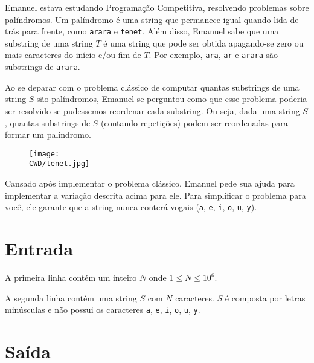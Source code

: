 %

Emanuel estava estudando Programação Competitiva, resolvendo problemas sobre palíndromos. Um palíndromo é uma string que permanece igual quando lida de trás para frente, como {\tt arara} e {\tt tenet}. Além disso, Emanuel sabe que uma substring de uma string $T$ é uma string que pode ser obtida apagando-se zero ou mais caracteres do início e/ou fim de $T$. Por exemplo, {\tt ara}, {\tt ar} e {\tt arara} são substrings de {\tt arara}.

Ao se deparar com o problema clássico de computar quantas substrings de uma string $S$ são palíndromos, Emanuel se perguntou como que esse problema poderia ser resolvido se pudessemos reordenar cada substring. Ou seja, dada uma string $S$, quantas substrings de $S$ (contando repetições) podem ser reordenadas para formar um palíndromo.

\begin{figure}[H]
    \centering
    \texttt{[image: \\CWD/tenet.jpg]}
\end{figure}

Cansado após implementar o problema clássico, Emanuel pede sua ajuda para implementar a variação descrita acima para ele. Para simplificar o problema para você, ele garante que a string nunca conterá vogais ({\tt a}, {\tt e}, {\tt i}, {\tt o}, {\tt u}, {\tt y}).

%
%

\section*{Entrada}

A primeira linha contém um inteiro $N$ onde $1 \leq N \leq 10^6$.

A segunda linha contém uma string $S$ com $N$ caracteres. $S$ é composta por letras minúsculas e não possui os caracteres {\tt a}, {\tt e}, {\tt i}, {\tt o}, {\tt u}, {\tt y}.

%
%

\section*{Saída}

